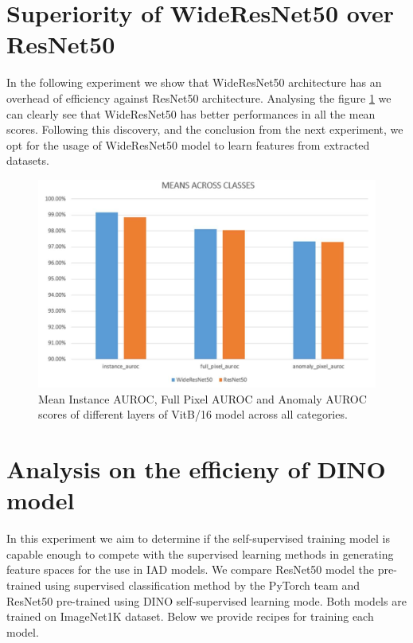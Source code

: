 \section{Superiority of WideResNet50 over ResNet50}
In the following experiment we show that WideResNet50 architecture has an overhead of efficiency against ResNet50 architecture. Analysing the figure \ref{fig:resnet_vs_wideresnet} we can clearly see that WideResNet50 has better performances in all the mean scores. Following this discovery, and the conclusion from the next experiment, we opt for the usage of WideResNet50 model to learn features from extracted datasets.

\begin{figure}[h]
	\begin{center}
		\includegraphics[width=1.0\linewidth]{Chapter_4/resnet_vs_wideresnet.png}
	\end{center}
	\caption{Mean Instance AUROC, Full Pixel AUROC and Anomaly AUROC scores of different layers of VitB/16 model across all categories.}
	\label{fig:resnet_vs_wideresnet}
\end{figure}

\section{Analysis on the efficieny of DINO model}
\label{sec:dino_tests}
In this experiment we aim to determine if the self-supervised training model is capable enough to compete with the supervised learning methods in generating feature spaces for the use in IAD models. We compare ResNet50 model the pre-trained using supervised classification method by the PyTorch team and ResNet50 pre-trained using DINO self-supervised learning mode. Both models are trained on ImageNet1K dataset. Below we provide recipes for training each model.

